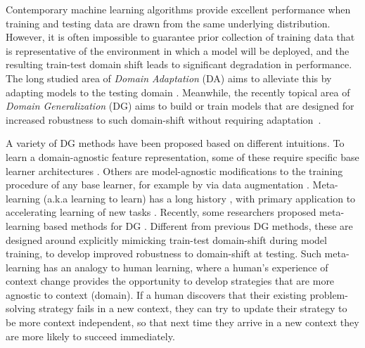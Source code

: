 \documentclass[runningheads]{llncs}
\begin{document}
Contemporary machine learning algorithms provide excellent performance when training and testing data are drawn from the same underlying distribution. However, it is often impossible to guarantee prior collection of training data that is representative of the environment in which a model will be deployed, and the resulting train-test domain shift leads to significant degradation in performance. The long studied area of \emph{Domain Adaptation} (DA) aims to alleviate this by adapting models to the testing domain \cite{shai2006nipsdomainadaptation,tzeng2014deep,long2015learning,ganin2016dann,mslongnips2016,bousmalis2016domain}. Meanwhile, the recently topical area of \emph{Domain Generalization} (DG) aims to build or train models that are designed for increased robustness to such domain-shift without requiring adaptation~\cite{muandet2013domaingeneralization,ghifary2015domain,da2017dg,Li2018MLDG,mmdaaecvpr2018,shiv2018dg,NIPS2018_metareg}.

A variety of DG methods have been proposed based on different intuitions. To learn a domain-agnostic feature representation, some of these require specific base learner architectures \cite{muandet2013domaingeneralization,ghifary2015domain,ECCV12_Khosla}. Others are model-agnostic modifications to the training procedure of any base learner, for example by via data augmentation \cite{shiv2018dg,riccardo_nips18}. Meta-learning (a.k.a learning to learn) has a long history  \cite{Schmidhuber95onlearning,1991bengiolearningtolearn}, with primary application to accelerating learning of new tasks \cite{ravi2016optimization,pmlr-v80-wei18a}. Recently, some researchers proposed  meta-learning based methods for DG \cite{Li2018MLDG,NIPS2018_metareg}. Different from previous  DG methods, these are designed around explicitly mimicking train-test domain-shift during model training, to develop improved robustness to domain-shift at testing.  Such meta-learning has an analogy to human learning, where a human's experience of context change provides the opportunity to develop strategies that are more agnostic to context (domain). If a human discovers that their existing problem-solving strategy fails in a new context, they can try to update their strategy to be more context independent, so that next time they arrive in a new context they are more likely to succeed immediately. 
\end{document}
